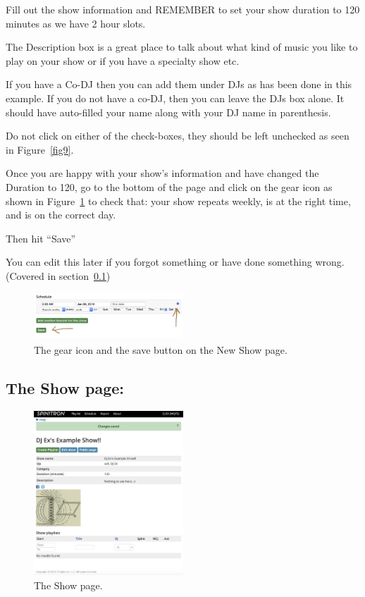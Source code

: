 \documentclass[12pt]{article}
\begin{document}
Fill out the show information and REMEMBER to set your show duration to 120 minutes as we have 2 hour slots.

The Description box is a great place to talk about what kind of music you like to play on your show or if you have a specialty show etc. 

If you have a Co-DJ then you can add them under DJs as has been done in this example. If you do not have a co-DJ, then you can leave the DJs box alone. It should have auto-filled your name along with your DJ name in parenthesis.

Do not click on either of the check-boxes, they should be left unchecked as seen in Figure~\ref{fig9}.

Once you are happy with your show's information and have changed the Duration to 120, go to the bottom of the page and click on the gear icon as shown in Figure~\ref{fig10} 
to check that: your show repeats weekly, is at the right time, and is on the correct day. 

Then hit ``Save''

You can edit this later if you forgot something or have done something wrong.
(Covered in section~\ref{show_page})

\begin{figure}[h]
    \centering
    \includegraphics[width=0.5\textwidth]{images/New_show_saving_options.png}
    \caption{The gear icon and the save button on the New Show page.}
    \label{fig10}
\end{figure}

\subsection{The Show page:} \label{show_page}

\begin{figure}
    \includegraphics[width=0.5\textwidth]{images/New_show_page.png}
    \caption{The Show page.}
    \label{fig11}
\end{figure}
\end{document}

